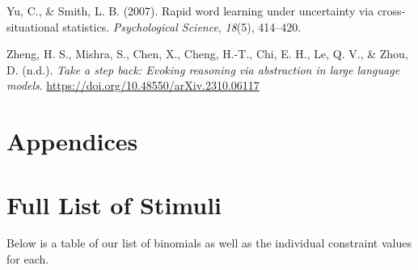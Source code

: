 \documentclass[
  10pt,
  nohyperref]{acl}
\newlength{\cslhangindent}
\newenvironment{CSLReferences}[2] %
 {\begin{list}{}{%
  \setlength{\itemindent}{0pt}
  \setlength{\leftmargin}{0pt}
  \setlength{\parsep}{0pt}
  \ifodd #1
   \setlength{\leftmargin}{\cslhangindent}
   \setlength{\itemindent}{-1\cslhangindent}
  \fi
  \setlength{\itemsep}{#2\baselineskip}}}
 {\end{list}}
\begin{document}
\begin{CSLReferences}{1}{0}
Yu, C., \& Smith, L. B. (2007). Rapid word learning under uncertainty
via cross-situational statistics. \emph{Psychological Science},
\emph{18}(5), 414--420.

Zheng, H. S., Mishra, S., Chen, X., Cheng, H.-T., Chi, E. H., Le, Q. V.,
\& Zhou, D. (n.d.). \emph{Take a step back: Evoking reasoning via
abstraction in large language models}.
\url{https://doi.org/10.48550/arXiv.2310.06117}

\end{CSLReferences}

\newpage

\section*{Appendices}\label{appendices}

\appendix

\renewcommand{\thesection}{\Alph{section}}

\setcounter{section}{0}



\section{Full List of Stimuli}\label{sec-full-list-of-stimuli}

Below is a table of our list of binomials as well as the individual
constraint values for each.
\end{document}
